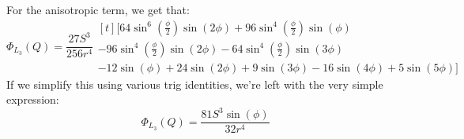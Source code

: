 \documentclass[reqno]{article}
\begin{document}
For the anisotropic term, we get that:
\begin{equation}
  \Phi_{L_3}(Q) =
  \frac{27 S^{3}}{256 r^{4}} \begin{multlined}[t]
    \bigl[
    64 \sin^{6}\left(\frac{\phi}{2} \right) \sin\left(2 \phi \right)
    + 96 \sin^{4}\left(\frac{\phi}{2} \right) \sin\left(\phi \right) \\
    - 96 \sin^{4}\left(\frac{\phi}{2} \right) \sin\left(2 \phi \right)
    - 64 \sin^{4}\left(\frac{\phi}{2} \right) \sin\left(3 \phi \right) \\
    - 12 \sin\left(\phi \right) 
    + 24 \sin\left(2 \phi \right) 
    + 9 \sin\left(3 \phi \right)
    - 16 \sin\left(4 \phi \right)
    + 5 \sin\left(5 \phi \right)
    \bigr]
    \end{multlined}
\end{equation}
If we simplify this using various trig identities, we're left with the very simple expression:
\begin{equation}
  \Phi_{L_3} (Q) = \frac{81 S^{3} \sin\left(\phi \right)}{32 r^{4}}
\end{equation}
\end{document}
